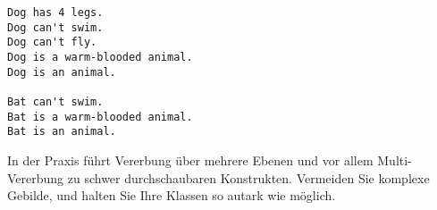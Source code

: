 \begin{frame}[fragile]
%
\begin{tcbraster}[raster columns=2,
                  raster equal height,
                  nobeforeafter,
                  raster column skip=0.5cm]
\begin{cmdbox}
\begin{verbatim}
Dog has 4 legs.
Dog can't swim.
Dog can't fly.
Dog is a warm-blooded animal.
Dog is an animal.

Bat can't swim.
Bat is a warm-blooded animal.
Bat is an animal.
\end{verbatim}
\end{cmdbox}
%
\begin{hintbox}
In der Praxis führt Vererbung über mehrere Ebenen und vor allem Multi-Vererbung zu schwer durchschaubaren Konstrukten.
Vermeiden Sie komplexe Gebilde, und halten Sie Ihre Klassen so autark wie möglich.
\end{hintbox}
\end{tcbraster}
%
\end{frame}